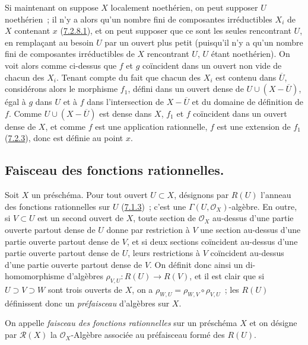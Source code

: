 Si maintenant on suppose $X$ localement noethérien, on peut supposer $U$
noethérien~; il n'y a alors qu'un nombre fini de composantes irréductibles
$X_i$ de $X$ contenant $x$ (\hyperref[I.7.2.8.1-fr]{7.2.8.1}), et on peut
supposer que ce sont les seules rencontrant $U$, en remplaçant au besoin $U$
par un ouvert plus petit (puisqu'il n'y a qu'un nombre fini de composantes
irréductibles de $X$ rencontrant $U$, $U$ étant noethérien). On voit alors
comme ci-dessus que $f$ et $g$ coïncident dans un ouvert non vide de chacun
des $X_i$. Tenant compte du fait que chacun des $X_i$ est contenu dans
$\overline U$, considérons alors le morphisme $f_1$, défini dans un ouvert
dense de $U\cup(X-\overline U)$, égal à $g$ dans $U$ et à $f$ dans
l'intersection de $X-\overline U$ et du domaine de définition de $f$. Comme
$U\cup(X-\overline U)$ est dense dans $X$, $f_1$ et $f$ coïncident dans un
ouvert dense de $X$, et comme $f$ est une application rationnelle, $f$ est
une extension de $f_1$ (\hyperref[I.7.2.3-fr]{7.2.3}), donc est définie au
point $x$.

\subsection{Faisceau des fonctions rationnelles.}
\label{subsection:I.7.3-fr}

\begin{env}[7.3.1]
\label{I.7.3.1-fr}
Soit $X$ un préschéma. Pour tout ouvert $U\subset X$, désignons par $R(U)$
l'anneau des fonctions rationnelles sur $U$
(\hyperref[I.7.1.3-fr]{7.1.3})~; c'est une
$\Gamma(U,\mathscr{O}_X)$-algèbre. En outre, si $V\subset U$ est un second
ouvert de $X$, toute section de $\mathscr{O}_X$ au-dessus d'une partie
ouverte partout dense de $U$ donne par restriction à $V$ une section
au-dessus d'une partie ouverte partout dense de $V$, et si deux sections
coïncident au-dessus d'une partie ouverte partout dense de $U$, leurs
restrictions à $V$ coïncident au-dessus d'une partie ouverte partout dense de
$V$. On définit donc ainsi un di-homomorphisme d'algèbres
$\rho_{V,U}:R(U)\to R(V)$, et il est clair que si $U\supset V\supset W$ sont
trois ouverts de $X$, on a
$\rho_{W,U}=\rho_{W,V}\circ\rho_{V,U}$~; les $R(U)$ définissent donc un
\emph{préfaisceau} d'algèbres sur $X$.
\end{env}

\begin{definition}[7.3.2]
\label{I.7.3.2-fr}
On appelle \emph{faisceau des fonctions rationnelles} sur un préschéma $X$
et on désigne par $\mathscr{R}(X)$ la $\mathscr{O}_X$-Algèbre associée au
préfaisceau formé des $R(U)$.
\end{definition}

